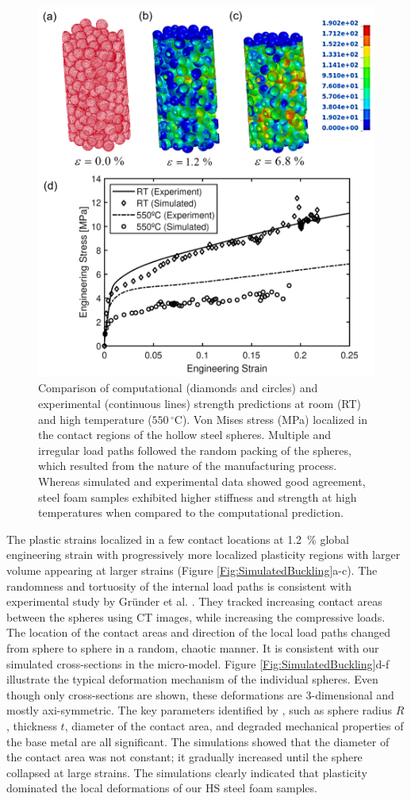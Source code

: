 \documentclass[review]{elsarticle}
\begin{document}
\begin{figure}[htbp]
	\begin{center}
		\includegraphics[width=0.75\linewidth]
		{Tex-Figures/Fig10-SimulatedCompression}
		\caption{Comparison of computational (diamonds and circles) and experimental (continuous lines) strength predictions at room (RT) and high temperature ($550\,^{\circ}\mathrm{C}$). Von Mises stress (MPa) localized in the contact regions of the hollow steel spheres. Multiple and irregular load paths followed the random packing of the spheres, which resulted from the nature of the manufacturing process. Whereas simulated and experimental data showed good agreement, steel foam samples exhibited higher stiffness and strength at high temperatures when compared to the computational prediction.}
		\label{Figure5}
	\end{center}
\end{figure}

The plastic strains localized in a few contact locations at 1.2~\% global engineering strain with progressively more localized plasticity regions with larger volume appearing at larger strains (Figure \ref{Fig:SimulatedBuckling}a-c). The randomness and tortuosity of the internal load paths is consistent with experimental study by Gr\"{u}nder et al. \cite{grunder_modeling_2001}. They tracked increasing contact areas between the spheres using CT images, while increasing the compressive loads. The location of the contact areas and direction of the local load paths changed from sphere to sphere in a random, chaotic manner. It is consistent with our simulated cross-sections in the micro-model. Figure \ref{Fig:SimulatedBuckling}d-f illustrate the typical deformation mechanism of the individual spheres. Even though only cross-sections are shown, these deformations are 3-dimensional and mostly axi-symmetric. The key parameters identified by \cite{Fallet2008}, such as sphere radius $R$, thickness $t$, diameter of the contact area, and degraded mechanical properties of the base metal are all significant. The simulations showed that the diameter of the contact area was not constant; it gradually increased until the sphere collapsed at large strains. The simulations clearly indicated that plasticity dominated the local deformations of our HS steel foam samples.
\end{document}
